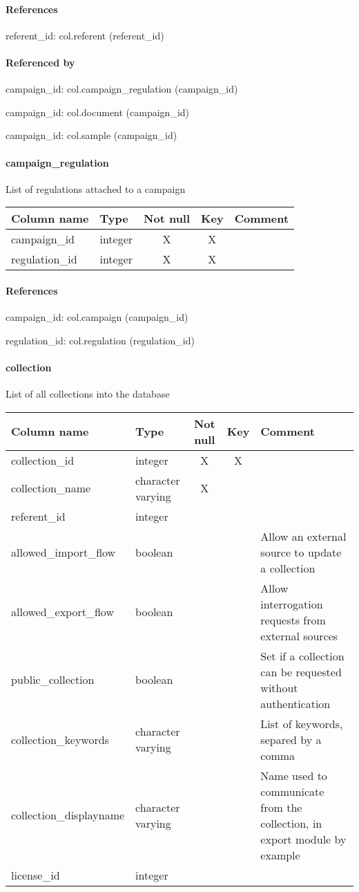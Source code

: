 \paragraph{References}
referent\_id: col.referent (referent\_id)

\paragraph{Referenced by}
campaign\_id: col.campaign\_regulation (campaign\_id)

campaign\_id: col.document (campaign\_id)

campaign\_id: col.sample (campaign\_id)

\paragraph{campaign\_regulation}
List of regulations attached to a campaign

\begin{tabular}{|l| p{2cm}|c|c| p{5cm}|}
\hline
Column name & Type & Not null & Key & Comment \\
\hline
campaign\_id & integer & X & X & \\
regulation\_id & integer & X & X & \\
\hline
\end{tabular}
\paragraph{References}
campaign\_id: col.campaign (campaign\_id)

regulation\_id: col.regulation (regulation\_id)

\paragraph{collection}
List of all collections into the database

\begin{tabular}{|l| p{2cm}|c|c| p{5cm}|}
\hline
Column name & Type & Not null & Key & Comment \\
\hline
collection\_id & integer & X & X & \\
collection\_name & character varying & X &  & \\
referent\_id & integer &  &  & \\
allowed\_import\_flow & boolean &  &  & Allow an external source to update a collection\\
allowed\_export\_flow & boolean &  &  & Allow interrogation requests from external sources\\
public\_collection & boolean &  &  & Set if a collection can be requested without authentication\\
collection\_keywords & character varying &  &  & List of keywords, separed by a comma\\
collection\_displayname & character varying &  &  & Name used to communicate from the collection, in export module by example\\
license\_id & integer &  &  & \\
\hline
\end{tabular}
